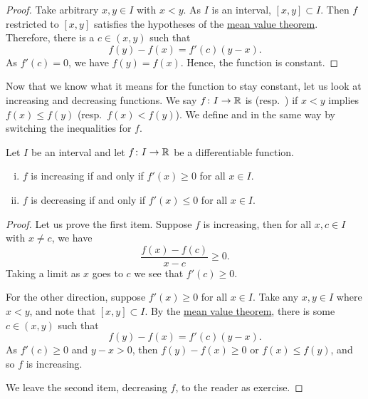 \begin{proof}
Take arbitrary $x,y \in I$ with $x < y$.
As $I$ is an interval, $[x,y] \subset I$.
Then $f$ restricted to $[x,y]$ satisfies the hypotheses
of the \hyperref[thm:mvt]{mean value theorem}.
Therefore, there is a $c \in (x,y)$ such that
\begin{equation*}
f(y)-f(x) = f'(c)(y-x).
\end{equation*}
As $f'(c) = 0$, we have $f(y) = f(x)$.  Hence,
the function is constant.
\end{proof}

Now that we know what it means for the function to stay constant, let us look
at increasing and decreasing functions.
We say $f \colon I \to {\mathbb{R}}$ is \emph{}
(resp.\  \emph{}) if
$x < y$ implies $f(x) \leq f(y)$ (resp.\ $f(x) < f(y)$).
We define
\emph{} and
\emph{} in the same way by switching the
inequalities for $f$.

\begin{prop} \label{incdecdiffprop}
Let $I$ be an interval and
let $f \colon I \to {\mathbb{R}}$ be a differentiable function.
\begin{enumerate}[(i)]
\item $f$ is increasing if and only if $f'(x) \geq 0$ for all $x \in I$.
\item $f$ is decreasing if and only if $f'(x) \leq 0$ for all $x \in I$.
\end{enumerate}
\end{prop}

\begin{proof}
Let us prove the first item.  Suppose $f$ is increasing, then
for all $x,c \in I$ with $x \neq c$, we have
\begin{equation*}
\frac{f(x)-f(c)}{x-c} \geq 0 .
\end{equation*}
Taking a limit as $x$ goes to $c$ we see that $f'(c) \geq 0$.

For the other direction, suppose $f'(x) \geq 0$ for all $x \in I$.
Take any $x, y \in I$ where $x < y$, and note that $[x,y] \subset I$.
By the \hyperref[thm:mvt]{mean value theorem}, there is some $c \in (x,y)$ such that
\begin{equation*}
f(y)-f(x) = f'(c)(y-x) .
\end{equation*}
As $f'(c) \geq 0$ and $y-x > 0$, then $f(y) - f(x) \geq 0$ or $f(x) \leq
f(y)$, and so
$f$ is increasing.

We leave the second item, decreasing $f$, to the reader as exercise.
\end{proof}

